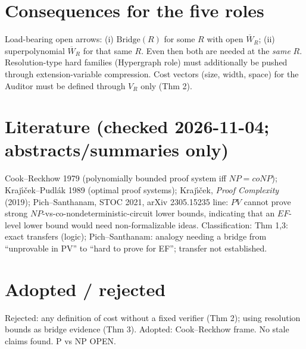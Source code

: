 \documentclass{article}\usepackage{amsmath,amssymb,amsthm}
\newcommand{\W}{\overline W}\newcommand{\UNSAT}{\mathrm{UNSAT}}
\begin{document}
\section{Consequences for the five roles}
Load-bearing open arrows: (i) $\mathrm{Bridge}(R)$ for some $R$ with open $\W_R$; (ii) superpolynomial $\W_R$ for that same $R$. Even then both are needed at the \emph{same} $R$. Resolution-type hard families (Hypergraph role) must additionally be pushed through extension-variable compression. Cost vectors (size, width, space) for the Auditor must be defined through $V_R$ only (Thm 2).

\section{Literature (checked 2026-11-04; abstracts/summaries only)}
Cook--Reckhow 1979 (polynomially bounded proof system iff $NP=coNP$); Kraj\'{\i}\v{c}ek--Pudl\'ak 1989 (optimal proof systems); Kraj\'{\i}\v{c}ek, \emph{Proof Complexity} (2019); Pich--Santhanam, STOC 2021, arXiv 2305.15235 line: $PV$ cannot prove strong $NP$-vs-co-nondeterministic-circuit lower bounds, indicating that an $EF$-level lower bound would need non-formalizable ideas. Classification: Thm 1,3: exact transfers (logic); Pich--Santhanam: analogy needing a bridge from ``unprovable in PV'' to ``hard to prove for EF''; transfer not established.

\section{Adopted / rejected}
Rejected: any definition of cost without a fixed verifier (Thm 2); using resolution bounds as bridge evidence (Thm 3). Adopted: Cook--Reckhow frame. No stale claims found. P vs NP OPEN.
\end{document}
